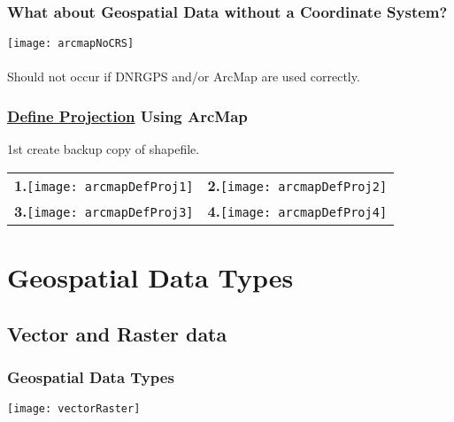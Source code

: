 \documentclass[t]{beamer} %
\begin{document}

\begin{frame}
\frametitle{What about Geospatial Data without a Coordinate System?}

\texttt{[image: arcmapNoCRS]}\\~\\

Should not occur if DNRGPS and/or ArcMap are used correctly.
\end{frame}


\begin{frame}
\frametitle{\underline{Define Projection} Using ArcMap}
1st create backup copy of shapefile.
\vspace{-0.2in}
\begin{table}
\begin{tabular}{l l}
\textbf{1.}\texttt{[image: arcmapDefProj1]} & \textbf{2.}\texttt{[image: arcmapDefProj2]} \\
\textbf{3.}\texttt{[image: arcmapDefProj3]} & \textbf{4.}\texttt{[image: arcmapDefProj4]} \\
\end{tabular}
\end{table}

\end{frame}


\section{Geospatial Data Types}
\subsection{Vector and Raster data}
\begin{frame}
\frametitle{Geospatial Data Types}

\vspace{-0.30in}
\center
\texttt{[image: vectorRaster]}

\end{frame}

\end{document}
